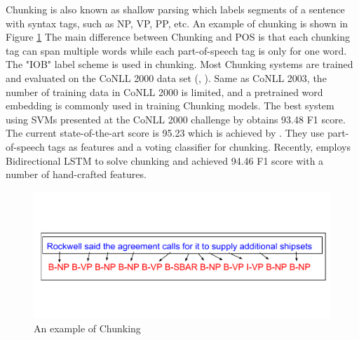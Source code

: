 Chunking is also known as shallow parsing which labels segments of a sentence with syntax tags, such as NP, VP, PP, etc.  An example of chunking is shown in Figure \ref{fig:chunk-ex} The main difference between Chunking and POS is that each chunking tag can span multiple words while each part-of-speech tag is only for one word. The "IOB" label scheme is used in chunking. Most Chunking systems are trained and evaluated on the CoNLL 2000 data set (\citeauthor{tjong2000introduction}, \citeyear{tjong2000introduction}). Same as CoNLL 2003, the number of training data in CoNLL 2000 is limited, and a pretrained word embedding is commonly used in training Chunking models. The best system using SVMs presented at the CoNLL 2000 challenge by \cite{Kudoh:2000:USV:1117601.1117635} obtains 93.48 F1 score. The current state-of-the-art score is 95.23 which is achieved by \cite{shen2005voting}. They use part-of-speech tags as features and a voting classifier for chunking. Recently, \cite{huang2015bidirectional} employs Bidirectional LSTM to solve chunking and achieved 94.46 F1 score with a number of hand-crafted features.
\begin{figure}
  \centering
  \includegraphics[scale=0.8]{Chunkingex.pdf}
 \caption{An example of Chunking}
  \label{fig:chunk-ex}
\end{figure}

